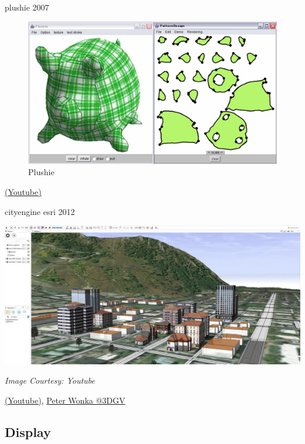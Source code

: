 \documentclass[aspectratio=169,xcolor={dvipsnames,svgnames}]{beamer}
\begin{document}
\begin{frame}[label={sec:orgf416231}]{plushie 2007}
\centering

\begin{figure}[htbp]
\centering
\includegraphics[width=0.6\linewidth]{images/plushie-2007.jpg}
\caption{Plushie \cite{MI07}}
\end{figure}

\href{https://www.youtube.com/watch?v=rbQWxL-\_8LU}{(Youtube)}
\end{frame}

\begin{frame}[label={sec:orge66c52d}]{cityengine esri 2012}
\centering

\begin{center}
\includegraphics[width=0.8\linewidth]{images/cityengine-esri.jpg}
\end{center}
\emph{Image Courtesy: Youtube}

\href{https://www.youtube.com/watch?v=aFRqSJFp-I0}{(Youtube)}, \href{https://www.youtube.com/watch?v=jsFztFXiPTM}{Peter Wonka @3DGV}
\end{frame}

\subsection{Display}
\label{sec:org491f208}
\end{document}
